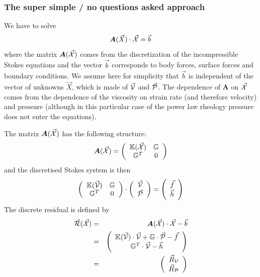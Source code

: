 \subsubsection*{The super simple / no questions asked approach}

We have to solve 
\[
{\bm A}(\vec{X}) \cdot \vec{\cal X} = \vec{b}
\]
where the matrix ${\bm A}(\vec{\cal X})$ comes from the discretization of the incompressible
Stokes equations and the vector $\vec{b}$ corresponds to body forces, surface forces and 
boundary conditions. We assume here for simplicity that $\vec{b}$
is independent of the vector of unknowns $\vec{X}$, which is made of
$\vec{\cal V}$ and $\vec{\cal P}$. The dependence of ${\bm A}$ on $\vec{\cal X}$ 
comes from the dependence of the viscosity on strain rate (and therefore velocity)
and pressure (although in this particular case of the power law rheology pressure does 
not enter the equations). 

The matrix ${\bm A}(\vec{\cal X})$ has the following structure:
\begin{equation}
{\bm A}(\vec{\cal X}) = 
\left(
\begin{array}{cc}
{\mathbb{K}}(\vec{\cal X}) & {\mathbb{G}}  \\
{\mathbb{G}}^T & 0 
\end{array}
\right)
\end{equation} 
and the discretised Stokes system is then
\begin{equation}
\left(
\begin{array}{cc}
{\mathbb{K}}(\vec{\cal V}) & {\mathbb{G}}  \\
{\mathbb{G}}^T & 0 
\end{array}
\right)
\cdot
\left(
\begin{array}{cc}
\vec{\cal V} \\
\vec{\cal P} \\
\end{array}
\right)
=
\left(
\begin{array}{cc}
\vec{f} \\ \vec{h}
\end{array}
\right)
\end{equation}
The discrete residual is defined by 
\begin{eqnarray}
\vec{\cal R}(\vec{\cal X}) 
&=& {\bm A}(\vec{\cal X})\cdot \vec{\cal X} - \vec{b} \label{eq:f87_res} \\
&=& 
\left(
\begin{array}{c}
{\mathbb{K}}(\vec{\cal V}) \cdot \vec{\cal V} + {\mathbb{G}} \cdot \vec{\cal P} - \vec{f} \\
{\mathbb{G}}^T \cdot \vec{\cal V} - \vec{h}
\end{array}
\right) \\
&=&
\left(
\begin{array}{cc}
\vec{R}_{\cal V} \\
\vec{R}_{\cal P} 
\end{array}
\right)
\end{eqnarray}



